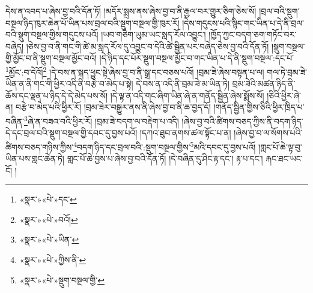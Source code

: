 དེས་ན་འབད་པ་ཞེས་བྱ་བའི་དོན་ཏོ། །མདོར་སྨྲས་ནས་ཞེས་བྱ་བ་ནི་རྒྱལ་བར་གྱུར་ཅིག་ཅེས་སོ། །བྲལ་བའི་སྡུག་བསྔལ་ཉིད་ཁུར་ཆེན་པོ་ཡིན་པས་བྲལ་བའི་སྡུག་བསྔལ་གྱི་ཁུར་རོ། །དེས་གདུངས་པའི་སྙིང་གང་ཡིན་པ་དེ་ནི་བྲལ་བའི་སྡུག་བསྔལ་གྱིས་གདུངས་པའོ། །ཡབ་གཅིག་ཡུམ་ཡང་སླད་རོལ་འབྱུང་། །ཁྱོད་ཀྱང་བདག་ཅག་གཏོང་བར་བཞེད། །ཅེས་བྱ་བ་ནི་གང་གི་ཚེ་མ་སླད་རོལ་དུ་འབྱུང་བ་དེའི་ཚེ་སྦྱིན་པར་བཞེད་ཅེས་བྱ་བའི་དོན་ཏོ། །སྡུག་བསྔལ་གྱི་མྱོང་བ་ནི་སྡུག་བསྔལ་མྱོང་བའོ། །དེ་ཉིད་དང་པོར་སྡུག་བསྔལ་མྱོང་བ་གང་ཡིན་པ་དེ་ནི་སྡུག་བསྔལ་:དང་པོ་\footnote{«སྣར་»«པེ་»དང་}མྱོང་:བ་དེའོ།\footnote{«སྣར་»«པེ་»བའོ།} །དེ་བས་ན་སྐད་ཕྱུང་སྟེ་ཞེས་བྱ་བ་ནི་སྒྲ་དང་བཅས་པའོ། །བྲམ་ཟེ་ཞེས་བསྟན་པ་ལ། གལ་ཏེ་བྲམ་ཟེ་ཡིན་ན་ནི་གང་གི་ཕྱིར་འདི་ནི་བརྩེ་བ་མེད་པ་སྟེ། དེ་བས་ན་འདི་ནི་བྲམ་ཟེ་མ་ཡིན་ཏེ། བྲམ་ཟེའི་མཚན་ཉིད་ནི་ཆོས་དང་ལྡན་པ་ཉིད་དེ་དེ་མེད་པས་སོ། །དེ་ལྟ་ན་འདི་གང་ཞིག་ཡིན་ཞེ་ན་གནོད་སྦྱིན་ཞེས་སྨོས་སོ། །ཅིའི་ཕྱིར་ཞེ་ན། བརྩེ་བ་མེད་པའི་ཕྱིར་རོ། །བྲམ་ཟེར་བསྒྱུར་ནས་ནི་ཞེས་བྱ་བ་ནི་ཆ་བྱད་དོ། །གནོད་སྦྱིན་གྱིས་ཅིའི་ཕྱིར་ཁྲིད་པ་བཞིན་\footnote{«སྣར་»«པེ་»ཡིན་}ཞེ་ན་བཟའ་བའི་ཕྱིར་རོ། །བྲམ་ཟེ་བདག་ལ་བརྡེག་པ་འདི། །ཞེས་བྱ་བའི་ཚིགས་བཅད་ཀྱིས་ནི་བདག་ཉིད་དེ་དང་བྲལ་བའི་སྡུག་བསྔལ་གྱི་དབང་དུ་བྱས་པའོ། །དཀའ་ཐུབ་ནགས་ཚལ་སྟོང་པ་ན། །ཞེས་བྱ་བ་ལ་སོགས་པའི་ཚིགས་བཅད་གཉིས་ཀྱིས་\footnote{«སྣར་»«པེ་»ཀྱིས་ནི་}བདག་ཉིད་དང་བྲལ་བའི་:སྡུག་བསྔལ་གྱིས་\footnote{«སྣར་»«པེ་»སྡུག་བསྔལ་གྱི་}མའི་དབང་དུ་བྱས་པའོ། །གླང་པོ་ཆེ་ལྟ་བུ་ཡིན་པས་གླང་ཆེན་ཏེ། གླང་པོ་ཆེ་བྱས་པ་ཞེས་བྱ་བའི་དོན་ཏོ། །དེ་བཞིན་དུ་ཤིང་རྟ་དང་། རྟ་པ་དང་། རྐང་ཐང་ཡང་ངོ། །
